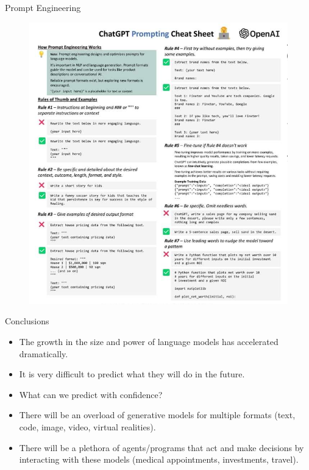 \documentclass[handout]{beamer}
\begin{document}
\begin{frame}{Prompt Engineering}


 \begin{figure}[h]
        	\includegraphics[scale = 0.35]{pics/prompting.png}
        \end{figure}




\end{frame}


\begin{frame}{Conclusions}

\begin{scriptsize}
\begin{itemize}
\item The growth in the size and power of language models has accelerated dramatically.
\item It is very difficult to predict what they will do in the future.
\item What can we predict with confidence?
\item There will be an overload of generative models for multiple formats (text, code, image, video, virtual realities).
\item There will be a plethora of agents/programs that act and make decisions by interacting with these models (medical appointments, investments, travel).
\end{itemize}
\end{scriptsize}



\end{frame}
\end{document}
